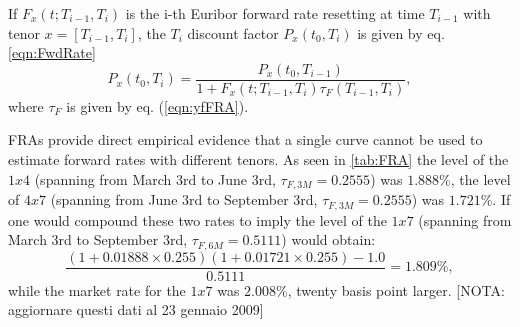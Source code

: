 \documentclass[11pt,reqno]{amsart}
\begin{document}
If $F_{x}\left(t;T_{i-1},T_{i}\right)$ is the i-th Euribor forward rate resetting at time $T_{i-1}$ with tenor $x=\left[T_{i-1},T_{i}\right]$, the $T_i$ discount factor $P_{x}\left(t_0,T_i\right)$ is given by eq. \ref{eqn:FwdRate}
\begin{equation}
P_x\left(t_0,T_i\right) = \frac{P_x\left(t_0,T_{i-1}\right)}{1+F_{x}\left(t;T_{i-1},T_{i}\right)\tau_F\left(T_{i-1},T_{i}\right) },
\label{eqn:FRA}
\end{equation}
where $\tau_F$ is given by eq. (\ref{eqn:yfFRA}).
\par
FRAs provide direct empirical evidence that a single curve cannot be used to estimate forward rates with different tenors. As seen in \ref{tab:FRA} the level of the $1x4$ (spanning from March 3rd to June 3rd, $\tau_{F,3M} = 0.2555$) was $1.888\%$, the level of $4x7$ (spanning from June 3rd to September 3rd, $\tau_{F,3M} = 0.2555$) was $1.721\%$. If one would compound these two rates to imply the level of the $1x7$ (spanning from March 3rd to September 3rd, $\tau_{F,6M} = 0.5111$) would obtain:
\begin{equation}
\frac{
    \left(1 + 0.01888 \times 0.255\right) \left(1 + 0.01721 \times 0.255\right) - 1.0}
    {0.5111 }
    = 1.809\%,
\label{eqn:FRAarbitrage}
\end{equation}
while the market rate for the $1x7$ was $2.008\%$, twenty basis point larger.
[NOTA: aggiornare questi dati al 23 gennaio 2009]
\end{document}
